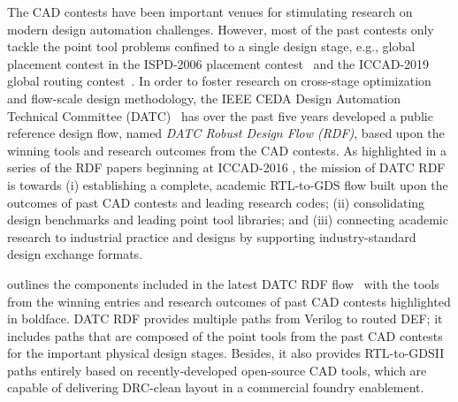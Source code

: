 
The CAD contests have been important venues for stimulating research on modern design automation challenges.
However, most of the past contests only tackle the point tool problems confined to a single design stage, e.g., global placement contest in the ISPD-2006 placement contest~\cite{nam:2006is} and the ICCAD-2019 global routing contest~\cite{dolgov:2019ca}.
In order to foster research on cross-stage optimization and flow-scale design methodology, the IEEE CEDA Design Automation Technical Committee (DATC)~\cite{ieee-datc} has over the past five years developed a public reference design flow, named \textit{DATC Robust Design Flow (RDF)}, based upon the winning tools and research outcomes from the CAD contests.
As highlighted in a series of the RDF papers beginning at ICCAD-2016 \cite{jung:2016od,jung:2017dr,jung:2018dr,jung:2018drod,chen:2019da,chen:2020da}, the mission of DATC RDF is towards (i) establishing a complete, academic RTL-to-GDS flow built upon the outcomes of past CAD contests and leading research codes; (ii) consolidating design benchmarks and leading point tool libraries; and (iii) connecting academic research to industrial practice and designs by supporting industry-standard design exchange formats.  

 outlines the components included in the latest DATC RDF flow~\cite{chen:2020da} with the tools from the winning entries and research outcomes of past CAD contests highlighted in boldface.
DATC RDF provides multiple paths from Verilog to routed DEF; it includes paths that are composed of the point tools from the past CAD contests for the important physical design stages. 
Besides, it also provides RTL-to-GDSII paths entirely based on recently-developed open-source CAD tools, which are capable of delivering DRC-clean layout in a commercial foundry enablement.

